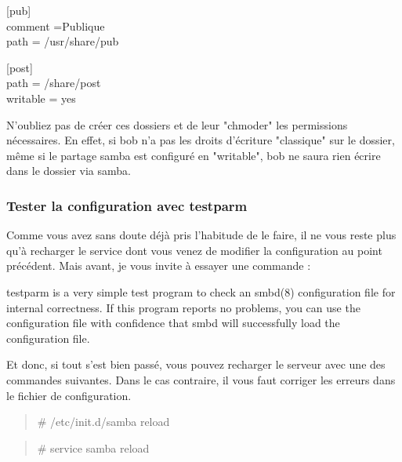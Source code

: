 \documentclass[a4paper,11pt]{article}
\newcommand{\commande}[1] {
    \begin{quote}
    \tt\raggedright #1
    \end{quote}
}
\newcommand{\man}[2]{
    \begin{tcolorbox}[toprule=3mm,width=\textwidth,outer arc=0mm,colbacktitle=grayman,coltitle=black,colback={grayman},colframe={grayman},title={man : \tt #1}]
        \tt\raggedright #2
    \end{tcolorbox}
}
\newcommand{\demi}[1]{
\begin{minipage}[t]{0.45\textwidth}
    \tt\raggedright
    #1
\end{minipage}
}
\begin{document}
\demi{
[pub]\\
comment =Publique\\
path = /usr/share/pub
}
\demi{
[post]\\
path = /share/post\\
writable = yes
}
\par N'oubliez pas de créer ces dossiers et de leur "chmoder" les permissions nécessaires. En effet, si bob n'a pas les droits d'écriture "classique" sur le dossier, même si le partage samba est configuré en "writable", bob ne saura rien écrire dans le dossier via samba.

\subsubsection{Tester la configuration avec testparm}
\par Comme vous avez sans doute déjà pris l'habitude de le faire, il ne vous reste plus qu'à recharger le service dont vous venez de modifier la configuration au point précédent. Mais avant, je vous invite à essayer une commande :
\man{testparm}{testparm is a very simple test program to check an smbd(8) configuration file for internal correctness. If this program reports no problems, you can use the configuration file with confidence that smbd will successfully load the configuration file.}
\par Et donc, si tout s’est bien passé, vous pouvez recharger le serveur avec une des commandes suivantes. Dans le cas contraire, il vous faut corriger les erreurs dans le fichier de configuration.
\commande{\# /etc/init.d/samba reload}
\commande{\# service samba reload}
\end{document}
